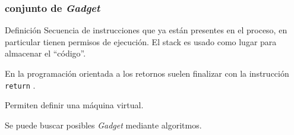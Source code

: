\documentclass{beamer}
\newcommand { \return } {\texttt{return} }
\newcommand { \vs } {\vspace{0.5cm}}
\begin{document}
\begin{frame}
    \frametitle{conjunto de \textit{Gadget}}
    \begin{block}{Definición}
        Secuencia de instrucciones que {ya están presentes en el proceso}, en particular tienen permisos de ejecución. El stack es usado como lugar para almacenar el ``código''.
    \end{block}

    En la programación orientada a los retornos suelen finalizar con la instrucción \return.\vs

    Permiten definir una máquina virtual.\vs
    
    \pause
    
    Se puede buscar posibles \textit{Gadget} mediante algoritmos.

\end{frame}
\end{document}
